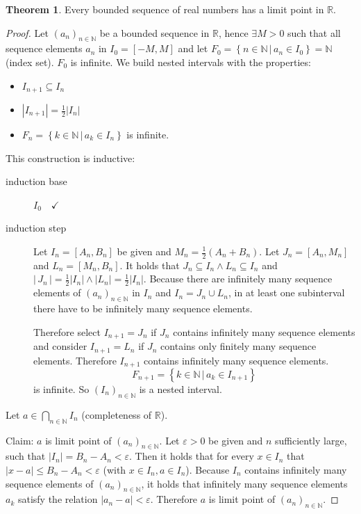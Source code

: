 \documentclass[a4paper,landscape,twocolumn]{article}
\theoremstyle{definition}
\newtheorem{theorem}{Theorem}
\newcommand\setdef[2]{\left\{#1\,|\,#2\right\}}
\newcommand\abs[1]{\left|#1\right|}
\newcommand\seq[1]{{\left(#1\right)}_{n \in \mathbb N}}
\newcommand\card[1]{\left|\,#1\,\right|}
\begin{document}
\begin{theorem}
  Every bounded sequence of real numbers has a limit point in $\mathbb R$.
\end{theorem}
\begin{proof}
  Let $\seq{a_n}$ be a bounded sequence in $\mathbb R$, hence $\exists M > 0$
  such that all sequence elements $a_n$ in $I_0 = [-M, M]$ and let
  $F_0 = \setdef{n \in \mathbb N}{a_n \in I_0} = \mathbb N$ (index set). $F_0$ is infinite.
  We build nested intervals with the properties:
  \begin{itemize}
    \item $I_{n+1} \subseteq I_n$
    \item $\abs{I_{n+1}} = \frac12 \abs{I_n}$
    \item $F_n = \setdef{k \in \mathbb N}{a_k \in I_n}$ is infinite.
  \end{itemize}

  This construction is inductive:
  \begin{description}
    \item[induction base] $I_0 \quad \checkmark$
    \item[induction step]
      Let $I_n = [A_n, B_n]$ be given and $M_n = \frac12(A_n + B_n)$.
      Let $J_n = [A_n, M_n]$ and $L_n = [M_n, B_n]$.
      It holds that $J_n \subseteq I_n \land L_n \subseteq I_n$
      and $\card{J_n} = \frac12 \abs{I_n} \land \abs{L_n} = \frac12 \abs{I_n}$.
      Because there are infinitely many sequence elements of $\seq{a_n}$ in $I_n$
      and $I_n = J_n \cup L_n$, in at least one subinterval there have to be
      infinitely many sequence elements.

      Therefore select $I_{n+1} = J_n$ if $J_n$ contains infinitely many sequence elements
      and consider $I_{n+1} = L_n$ if $J_n$ contains only finitely many sequence elements.
      Therefore $I_{n+1}$ contains infinitely many sequence elements.
      \[ F_{n+1} = \setdef{k \in \mathbb N}{a_k \in I_{n+1}} \]
      is infinite.
      So $(I_n)_{n \in \mathbb N}$ is a nested interval.
  \end{description}

  Let $a \in \bigcap_{n \in \mathbb N} I_n$ (completeness of $\mathbb R$).

  Claim:
  $a$ is limit point of $\seq{a_n}$. Let $\varepsilon > 0$ be given and $n$ sufficiently large,
  such that $\abs{I_n} = B_n - A_n < \varepsilon$.
  Then it holds that for every $x \in I_n$ that $\abs{x - a} \leq B_n - A_n < \varepsilon$ (with $x \in I_n, a \in I_n$).
  Because $I_n$ contains infinitely many sequence elements of $\seq{a_n}$, it holds that
  infinitely many sequence elements $a_k$ satisfy the relation $\abs{a_n - a} < \varepsilon$.
  Therefore $a$ is limit point of $\seq{a_n}$.
\end{proof}
\end{document}
